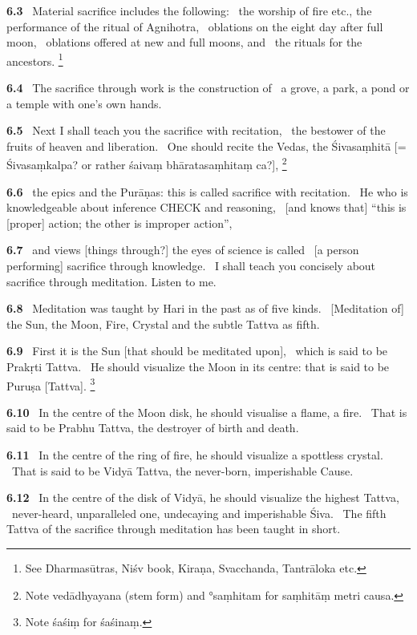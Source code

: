 \documentclass{article}
\begin{document}
\textbf{6.3}%
\ Material sacrifice includes the following:%
\                 the worship of fire etc., the performance of the ritual of Agnihotra,%
\                 oblations on the eight day after full moon,%
\                 oblations offered at new and full moons, and%
\                 the rituals for the ancestors.%
\footnote{See Dharmasūtras, Niśv book, Kiraṇa, Svacchanda, Tantrāloka etc. }%


\textbf{6.4}%
\ The sacrifice through work is the construction of%
\              a grove, a park, a pond or a temple with one's own hands.%


\textbf{6.5}%
\ Next I shall teach you the sacrifice with recitation,%
\                 the bestower of the fruits of heaven and liberation.%
\                 One should recite the Vedas, the Śivasaṃhitā [= Śivasaṃkalpa? or rather śaivaṃ bhāratasaṃhitaṃ ca?],%
\footnote{Note vedādhyayana (stem form) and °saṃhitam for saṃhitāṃ metri causa. }%


\textbf{6.6}%
\ the epics and the Purāṇas: this is called sacrifice with recitation.%
\ He who is knowledgeable about inference CHECK and reasoning,%
\              [and knows that] ``this is [proper] action; the other is improper action'',%


\textbf{6.7}%
\ and views [things through?] the eyes of science is called%
\                         [a person performing] sacrifice through knowledge.%
\         I shall teach you concisely about sacrifice through meditation. Listen to me.%


\textbf{6.8}%
\ Meditation was taught by Hari in the past as of five kinds.%
\                 [Meditation of] the Sun, the Moon, Fire, Crystal and the subtle Tattva as fifth.%


\textbf{6.9}%
\ First it is the Sun [that should be meditated upon],%
\                 which is said to be Prakṛti Tattva.%
\         He should visualize the Moon in its centre: that is said to be Puruṣa [Tattva].%
\footnote{Note śaśiṃ for śaśinaṃ. }%


\textbf{6.10}%
\ In the centre of the Moon disk, he should visualise a flame, a fire.%
\                 That is said to be Prabhu Tattva, the destroyer of birth and death.%


\textbf{6.11}%
\ In the centre of the ring of fire, he should visualize a spottless crystal.%
\                 That is said to be Vidyā Tattva, the never-born, imperishable Cause.%


\textbf{6.12}%
\ In the centre of the disk of Vidyā, he should visualize the highest Tattva,%
\              never-heard, unparalleled one, undecaying and imperishable Śiva.%
\                 The fifth Tattva of the sacrifice through meditation has been taught in short.%
\end{document}
